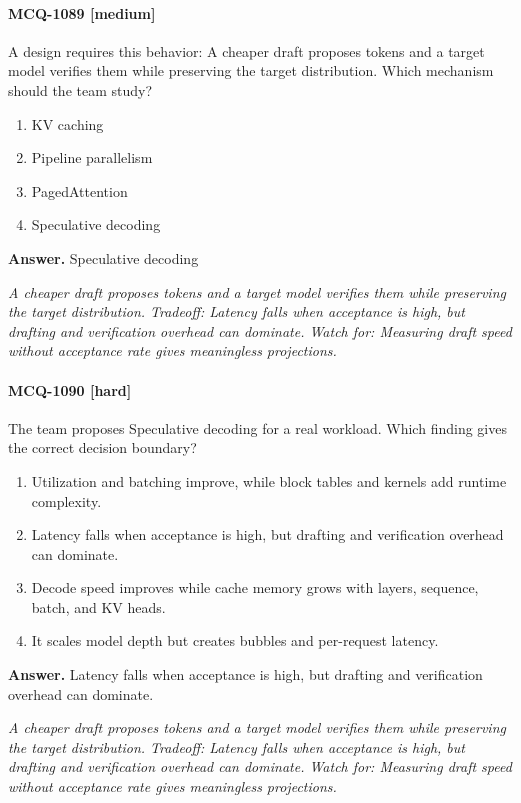 \paragraph{MCQ-1089 [medium]} A design requires this behavior: A cheaper draft proposes tokens and a target model verifies them while preserving the target distribution. Which mechanism should the team study?
\begin{enumerate}[label=\Alph*.]
\item KV caching
\item Pipeline parallelism
\item PagedAttention
\item Speculative decoding
\end{enumerate}
\noindent\textbf{Answer.} Speculative decoding
\par\textit{A cheaper draft proposes tokens and a target model verifies them while preserving the target distribution. Tradeoff: Latency falls when acceptance is high, but drafting and verification overhead can dominate. Watch for: Measuring draft speed without acceptance rate gives meaningless projections.}
\paragraph{MCQ-1090 [hard]} The team proposes Speculative decoding for a real workload. Which finding gives the correct decision boundary?
\begin{enumerate}[label=\Alph*.]
\item Utilization and batching improve, while block tables and kernels add runtime complexity.
\item Latency falls when acceptance is high, but drafting and verification overhead can dominate.
\item Decode speed improves while cache memory grows with layers, sequence, batch, and KV heads.
\item It scales model depth but creates bubbles and per-request latency.
\end{enumerate}
\noindent\textbf{Answer.} Latency falls when acceptance is high, but drafting and verification overhead can dominate.
\par\textit{A cheaper draft proposes tokens and a target model verifies them while preserving the target distribution. Tradeoff: Latency falls when acceptance is high, but drafting and verification overhead can dominate. Watch for: Measuring draft speed without acceptance rate gives meaningless projections.}

